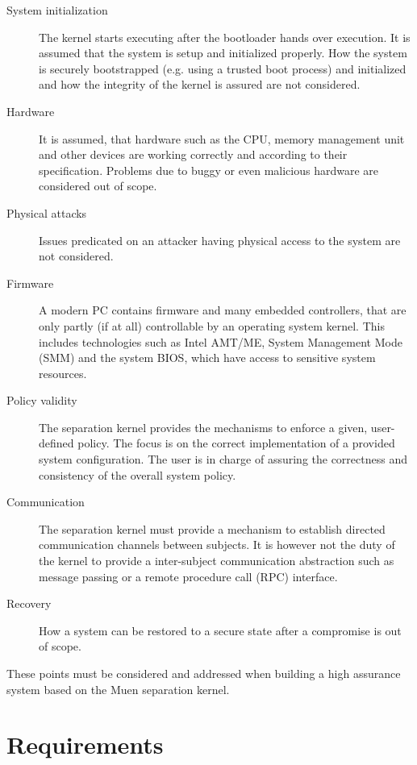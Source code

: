 \begin{description}
	\item[System initialization] The kernel starts executing after the
		bootloader hands over execution. It is assumed that the system is setup
		and initialized properly. How the system is securely bootstrapped (e.g.
		using a trusted boot process) and initialized and how the integrity of
		the kernel is assured are not considered.
	\item[Hardware] It is assumed, that hardware such as the CPU, memory
		management unit and other devices are working correctly and according to
		their specification. Problems due to buggy or even malicious hardware
		are considered out of scope.
	\item[Physical attacks] Issues predicated on an attacker having physical
		access to the system are not considered.
	\item[Firmware] A modern PC contains firmware and many embedded controllers,
		that are only partly (if at all) controllable by an operating system
		kernel. This includes technologies such as Intel AMT/ME, System
		Management Mode (SMM) and the system BIOS, which have access to
		sensitive system resources.
	\item[Policy validity] The separation kernel provides the mechanisms to
		enforce a given, user-defined policy. The focus is on the correct
		implementation of a provided system configuration. The user is in charge
		of assuring the correctness and consistency of the overall system
		policy.
	\item[Communication] The separation kernel must provide a
		mechanism to establish directed communication channels between subjects.
		It is however not the duty of the kernel to provide a inter-subject
		communication abstraction such as message passing or a remote procedure
		call (RPC) interface.
	\item[Recovery] How a system can be restored to a secure state after a
		compromise is out of scope.
\end{description}

These points must be considered and addressed when building a high assurance
system based on the Muen separation kernel.

\section{Requirements}

